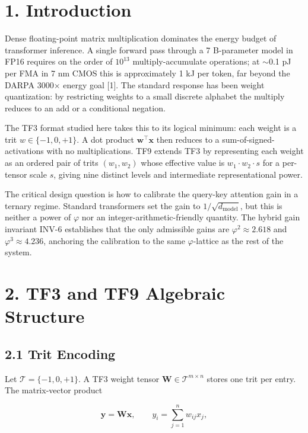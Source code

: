 \section{1. Introduction}\label{fa_08:introduction}

Dense floating-point matrix multiplication
dominates the energy budget of transformer
inference. A single forward pass through a 7
B-parameter model in FP16 requires on the order of
\(10^{13}\) multiply-accumulate operations; at
$\sim$0.1 pJ per FMA in 7 nm CMOS this is
approximately 1 kJ per token, far beyond the DARPA
3000$\times$ energy goal [1]. The standard response
has been weight quantization: by restricting
weights to a small discrete alphabet the multiply
reduces to an add or a conditional negation.

The TF3 format studied here takes this to its
logical minimum: each weight is a trit
\(w \in \{-1, 0, +1\}\). A dot product
\(\mathbf{w}^\top \mathbf{x}\) then reduces to a
sum-of-signed-activations with no multiplications.
TF9 extends TF3 by representing each weight as an
ordered pair of trits \((w_1, w_2)\) whose
effective value is \(w_1 \cdot w_2 \cdot s\) for a
per-tensor scale \(s\), giving nine distinct
levels and intermediate representational power.

The critical design question is how to calibrate
the query-key attention gain in a ternary regime.
Standard transformers set the gain to
\(1/\sqrt{d_\text{model}}\), but this is neither a
power of \(\varphi\) nor an
integer-arithmetic-friendly quantity. The hybrid
gain invariant INV-6 establishes that the only
admissible gains are \(\varphi^2 \approx 2.618\)
and \(\varphi^3 \approx 4.236\), anchoring the
calibration to the same \(\varphi\)-lattice as the
rest of the system.

\section{2. TF3 and TF9 Algebraic
Structure}\label{fa_08:tf3-and-tf9-algebraic-structure}

\subsection{2.1 Trit
Encoding}\label{fa_08:trit-encoding}

Let \(\mathcal{T} = \{-1, 0, +1\}\). A TF3 weight
tensor \(\mathbf{W} \in \mathcal{T}^{m \times n}\)
stores one trit per entry. The matrix-vector
product

\[\mathbf{y} = \mathbf{W}\mathbf{x}, \qquad y_i = \sum_{j=1}^{n} w_{ij} x_j,\]

